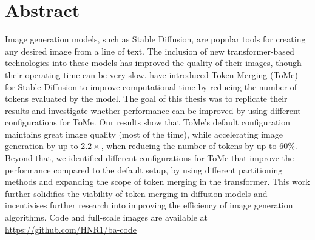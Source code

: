 \section*{Abstract}
Image generation models, such as Stable Diffusion, are popular tools for creating any desired image from a line of text. 
The inclusion of new transformer-based technologies into these models has improved the quality of their images, though their operating time can be very slow.
\cite{bolya2023tomesd} have introduced Token Merging (ToMe) for Stable Diffusion to improve computational time by reducing the number of tokens evaluated by the model.
The goal of this thesis was to replicate their results and investigate whether performance can be improved by using different configurations for ToMe.
Our results show that ToMe's default configuration maintains great image quality (most of the time), while accelerating image generation by up to $2.2 \times$, when reducing the number of tokens by up to \(60\%\). Beyond that, we identified different configurations for ToMe that improve the performance compared to the default setup, by using different partitioning methods and expanding the scope of token merging in the transformer. 
This work further solidifies the viability of token merging in diffusion models and incentivises further research into improving the efficiency of image generation algorithms.
Code and full-scale images are available at \url{https://github.com/HNR1/ba-code}
